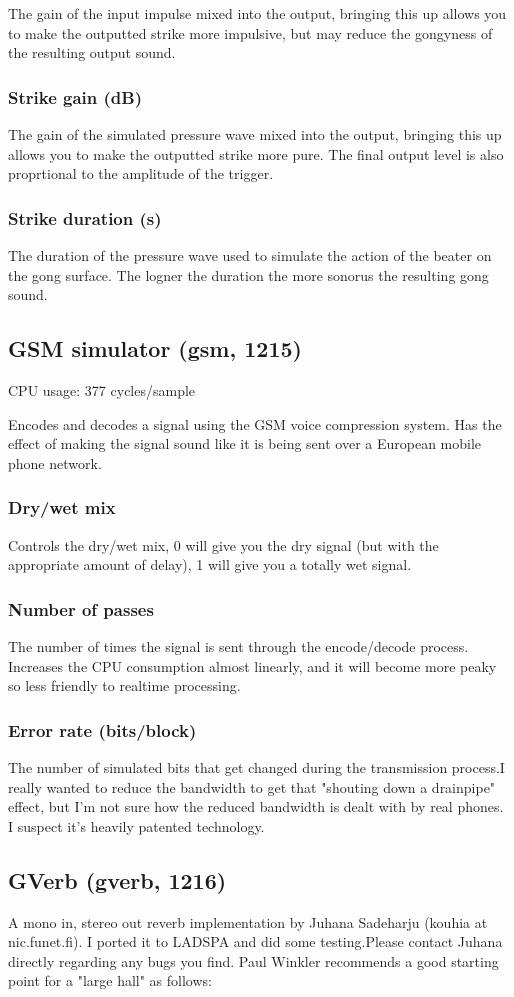 \documentclass[11pt]{article}
\begin{document}
The gain of the input impulse mixed into the output, bringing this up allows you to make the outputted strike more impulsive, but may reduce the gongyness of the resulting output sound.\subsubsection*{Strike gain (dB)}
The gain of the simulated pressure wave mixed into the output, bringing this up allows you to make the outputted strike more pure. The final output level is also proprtional to the amplitude of the trigger.\subsubsection*{Strike duration (s)}
The duration of the pressure wave used to simulate the action of the beater on the gong surface. The logner the duration the more sonorus the resulting gong sound.\subsection{GSM simulator (gsm, 1215)\label{gsm}\label{id1215}}
CPU usage: 377 cycles/sample

Encodes and decodes a signal using the GSM voice compression system. Has the effect of making the signal sound like it is being sent over a European mobile phone network.\subsubsection*{Dry/wet mix}
Controls the dry/wet mix, 0 will give you the dry signal (but with the appropriate amount of delay), 1 will give you a totally wet signal.\subsubsection*{Number of passes}
The number of times the signal is sent through the encode/decode process. Increases the CPU consumption almost linearly, and it will become more peaky so less friendly to realtime processing.\subsubsection*{Error rate (bits/block)}
The number of simulated bits that get changed during the transmission process.I really wanted to reduce the bandwidth to get that {}"shouting down a drainpipe{}" effect, but I'm not sure how the reduced bandwidth is dealt with by real phones. I suspect it's heavily patented technology.\subsection{GVerb (gverb, 1216)\label{gverb}\label{id1216}}
A mono in, stereo out reverb implementation by Juhana Sadeharju (kouhia at nic.funet.fi). I ported it to LADSPA and did some testing.Please contact Juhana directly regarding any bugs you find.
      Paul Winkler recommends a good starting point for a "large hall" as follows:
\end{document}
